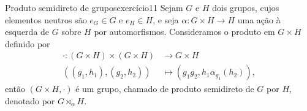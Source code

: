 \begin{proposition}{Produto semidireto de grupos}{exercício11}
    Sejam \(G\) e \(H\) dois grupos, cujos elementos neutros são \(e_G \in G\) e \(e_H \in H\), e seja \(\alpha : G \times H \to H\) uma ação à esquerda de \(G\) sobre \(H\) por automorfismos. Consideramos o produto em \(G \times H\) definido por
    \begin{align*}
        \cdot : (G \times H) \times (G \times H) &\to G\times H\\
                \left((g_1,h_1),(g_2,h_2)\right) &\mapsto \left(g_1 g_2, h_1 \alpha_{g_1}(h_2)\right),
    \end{align*}
    então \((G \times H, \cdot)\) é um grupo, chamado de produto semidireto de \(G\) por \(H\), denotado por \(G \rtimes_{\alpha} H\).
\end{proposition}
